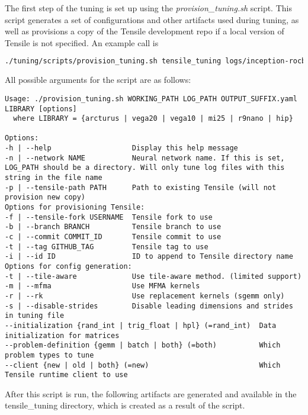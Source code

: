 \documentclass[]{article}
\begin{document}
The first step of the tuning is set up using the \emph{provision\_tuning.sh} script. This script generates a set of configurations and other artifacts used during tuning, as well as provisions a copy of the Tensile development repo if a local version of Tensile is not specified. An example call is


\begin{lstlisting}[language=bash,breaklines=true]
./tuning/scripts/provision_tuning.sh tensile_tuning logs/inception-rocblas-configs_unique.log tf_inception.yaml vega20
\end{lstlisting}

\noindent
All possible arguments for the script are as follows:

\begin{lstlisting}
Usage: ./provision_tuning.sh WORKING_PATH LOG_PATH OUTPUT_SUFFIX.yaml LIBRARY [options]
  where LIBRARY = {arcturus | vega20 | vega10 | mi25 | r9nano | hip}

Options:
-h | --help                   Display this help message
-n | --network NAME           Neural network name. If this is set, LOG_PATH should be a directory. Will only tune log files with this string in the file name
-p | --tensile-path PATH      Path to existing Tensile (will not provision new copy)
Options for provisioning Tensile:
-f | --tensile-fork USERNAME  Tensile fork to use
-b | --branch BRANCH          Tensile branch to use
-c | --commit COMMIT_ID       Tensile commit to use
-t | --tag GITHUB_TAG         Tensile tag to use
-i | --id ID                  ID to append to Tensile directory name
Options for config generation:
-t | --tile-aware             Use tile-aware method. (limited support)
-m | --mfma                   Use MFMA kernels
-r | --rk                     Use replacement kernels (sgemm only)
-s | --disable-strides        Disable leading dimensions and strides in tuning file
--initialization {rand_int | trig_float | hpl} (=rand_int)  Data initialization for matrices
--problem-definition {gemm | batch | both} (=both)          Which problem types to tune
--client {new | old | both} (=new)                          Which Tensile runtime client to use
\end{lstlisting}

After this script is run, the following artifacts are generated and available in the tensile\_tuning directory, which is created as a result of the script.
\end{document}
